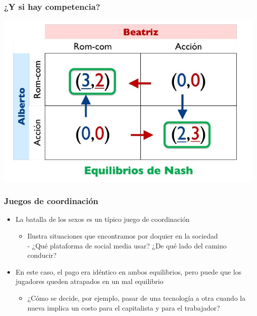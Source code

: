 \documentclass{beamer}
\begin{document}
\begin{frame}
\frametitle{¿Y si hay competencia?}
\centering
\includegraphics[scale=0.6]{Figures/Tema_03_33_batallasexo.jpg}
\end{frame}

\begin{frame}
\frametitle{Juegos de coordinación}
\begin{itemize}
        \item La batalla de los sexos es un típico juego de coordinación
        \begin{itemize}
            \item Ilustra situaciones que encontramos por doquier en la sociedad \\
            - ¿Qué plataforma de social media usar? ¿De qué lado del camino conducir?
        \end{itemize}
        \item En este caso, el pago era idéntico en ambos equilibrios, pero puede que los jugadores queden atrapados en un mal equilibrio
        \begin{itemize}
            \item ¿Cómo se decide, por ejemplo, pasar de una tecnología a otra cuando la nueva implica un costo para el capitalista y para el trabajador?
        \end{itemize}
\end{itemize}
\end{frame}
\end{document}

